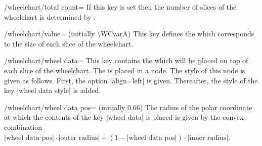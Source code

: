 \documentclass[a4paper,english,dvipsnames]{ltxdoc}
\begin{document}
\begin{key}{/wheelchart/total count=}
If this key is set then the number of slices of the wheelchart is determined by .
\begin{codeexample}[width=10cm,preamble={\usepackage{listofitems}}]
\readlist*{}
\setsepchar{ }
\readlist{}
\begin{tikzpicture}
\wheelchart[
    data={\WCdata[\WCcount]},
    slices style={
        /utils/exec={
            \pgfmathsetmacro
                {\WCcolornumber}
                {int(Mod({\WCcount-1},
                    \WCcolorslen)+1)}
        },
        \WCcolors[\WCcolornumber]
    },
    total count={\WCdatalen},
    value=1
]{}
\end{tikzpicture}
\end{codeexample}
\begin{codeexample}[width=10cm,preamble={\usepackage{siunitx}}]
\end{codeexample}
\end{key}
\begin{key}{/wheelchart/value= (initially \textbackslash WCvarA)}
This key defines the  which corresponds to the size of each slice of the wheelchart.
\end{key}
\begin{key}{/wheelchart/wheel data=}
This key contains the  which will be placed on top of each slice of the wheelchart. The  is placed in a node. The style of this node is given as follows. First, the option |align=left| is given. Thereafter, the style of the key |wheel data style| is added.
\end{key}
\begin{key}{/wheelchart/wheel data pos= (initially 0.66)}
The radius of the polar coordinate at which the contents of the key |wheel data| is placed is given by the convex combination $\text{|wheel data pos|}\cdot\text{|outer radius|}+(1-\text{|wheel data pos|})\cdot\text{|inner radius|}$.
\end{key}
\end{document}
